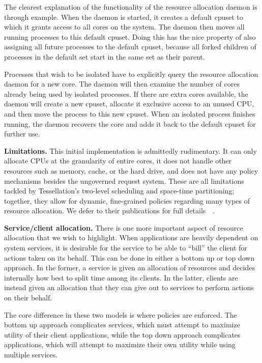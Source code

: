 \documentclass[letterpaper,twocolumn,11pt]{article}
\begin{document}
The clearest explanation of the functionality of the resource allocation daemon is through example. When the daemon is started, it creates a default cpuset to which it grants access to all cores on the system. The daemon then moves all running processes to this default cpuset. Doing this has the nice property of also assigning all future processes to the default cpuset, because all forked children of processes in the default set start in the same set as their parent.

Processes that wish to be isolated have to explicitly query the resource allocation daemon for a new core. The daemon will then examine the number of cores already being used by isolated processes. If there are extra cores available, the daemon will create a new cpuset, allocate it exclusive access to an unused CPU, and then move the process to this new cpuset. When an isolated process finishes running, the daemon recovers the core and adds it back to the default cpuset for further use.

\textbf{Limitations.} This initial implementation is admittedly rudimentary. It can only allocate CPUs at the granularity of entire cores, it does not handle other resources such as memory, cache, or the hard drive, and does not have any policy mechanisms besides the ungoverned request system. These are all limitations tackled by Tessellation's two-level scheduling and space-time partitioning; together, they allow for dynamic, fine-grained policies regarding many types of resource allocation. We defer to their publications for full details~\cite{liu09tessellation}~\cite{tessellation-hotpar10}.

\textbf{Service/client allocation.} There is one more important aspect of resource allocation that we wish to highlight. When applications are heavily dependent on system services, it is desirable for the service to be able to ``bill'' the client for actions taken on its behalf. This can be done in either a bottom up or top down approach. In the former, a service is given an allocation of resources and decides internally how best to split time among its clients. In the latter, clients are instead given an allocation that they can give out to services to perform actions on their behalf.

The core difference in these two models is where policies are enforced. The bottom up approach complicates services, which must attempt to maximize utility of their client applications, while the top down approach complicates applications, which will attempt to maximize their own utility while using multiple services.
\end{document}
